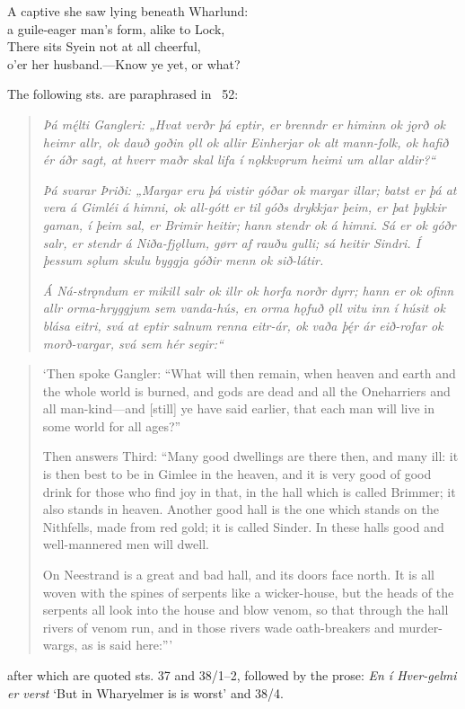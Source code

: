 \bvb A captive  she saw lying beneath Wharlund: \\
a guile-eager man’s form, alike to Lock, \\
There sits Syein not at all cheerful, \\
o’er her husband.—Know ye yet, or what?\evb\evg

\sectionline

{\small The following sts. are paraphrased in \Gylfaginning\ 52:

\begin{quote}
	\emph{Þá mę́lti Gangleri: „Hvat verðr þá eptir, er brenndr er himinn ok jǫrð ok heimr allr, ok dauð goðin ǫll ok allir Einherjar ok alt mann-folk, ok hafið ér áðr sagt, at hverr maðr skal lifa í nǫkkvǫrum heimi um allar aldir?“}

	\emph{Þá svarar Þriði: „Margar eru þá vistir góðar ok margar illar; batst er þá at vera á Gimléi á himni, ok all-gótt er til góðs drykkjar þeim, er þat þykkir gaman, í þeim sal, er Brimir heitir; hann stendr ok á himni. Sá er ok góðr salr, er stendr á Niða-fjǫllum, gørr af rauðu gulli; sá heitir Sindri. Í þessum sǫlum skulu byggja góðir menn ok sið-látir.}

	\emph{Á Ná-strǫndum er mikill salr ok illr ok horfa norðr dyrr; hann er ok ofinn allr orma-hryggjum sem vanda-hús, en orma hǫfuð ǫll vitu inn í húsit ok blása eitri, svá at eptir salnum renna eitr-ár, ok vaða þę́r ár eið-rofar ok morð-vargar, svá sem hér segir:“}
\end{quote}

\begin{quote}
	‘Then spoke Gangler: “What will then remain, when heaven and earth and the whole world is burned, and gods are dead and all the Oneharriers and all man-kind—and [still] ye have said earlier, that each man will live in some world for all ages?”

	Then answers Third: “Many good dwellings are there then, and many ill: it is then best to be in Gimlee in the heaven, and it is very good of good drink for those who find joy in that, in the hall which is called Brimmer; it also stands in heaven. Another good hall is the one which stands on the Nithfells, made from red gold; it is called Sinder. In these halls good and well-mannered men will dwell.

	On Neestrand is a great and bad hall, and its doors face north. It is all woven with the spines of serpents like a wicker-house, but the heads of the serpents all look into the house and blow venom, so that through the hall rivers of venom run, and in those rivers wade oath-breakers and murder-wargs, as is said here:”’
\end{quote}

after which are quoted sts. 37 and 38/1–2, followed by the prose: \emph{En í Hver-gelmi er verst} ‘But in Wharyelmer is is worst’ and 38/4.}

